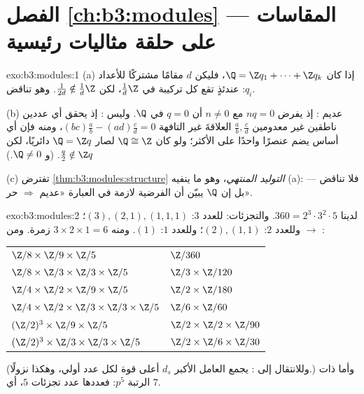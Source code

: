 \section*{الفصل \ref{ch:b3:modules} --- المقاسات على حلقة مثاليات
رئيسية}

\begin{solution}{exo:b3:modules:1}
(a) إذا كان $\Q = \Z q_1 + \dots + \Z q_k$، فليكن $d$ مقامًا مشتركًا للأعداد $q_i$: عندئذٍ
تقع كل تركيبة في $\frac1d\Z$، لكن $\frac1{2d} \notin \frac1d\Z$. وهو تناقض.

(b) عديم : إذ يفرض $nq = 0$ مع $n \neq 0$ أن $q = 0$ في
$\Q$. وليس : إذ يحقق أي عددين ناطقين غير معدومين $\frac ab, \frac cd$
العلاقةَ غير التافهة $(bc)\frac ab - (ad)\frac cd =
0$، ومنه فإن أي أساس يضم عنصرًا واحدًا
على الأكثر؛ ولو كان $\Q \cong \Z$ لصار $\Q = \Z q$ دائريًا، لكن
$\frac q2 \notin \Z q$. (و $\Q \neq
0$.)

(c) تفترض \cref{thm:b3:modules:structure} \emph{التوليد المنتهي}، وهو ما ينفيه (a):
فلا تناقض --- بل إن $\Q$ يبيّن أن الفرضية لازمة في العبارة
«عديم  $\Rightarrow$ حر».
\end{solution}

\begin{solution}{exo:b3:modules:2}
لدينا $360 = 2^3\cdot3^2\cdot5$. والتجزئات: للعدد $3$: $(3), (2,1),
(1,1,1)$؛ وللعدد $2$:
$(2), (1,1)$؛ وللعدد $1$: $(1)$. ومنه $3 \times 2
\times 1 = 6$ زمرة. ومن  $\to$ :
\begin{center}
\begin{tabular}{l l}
$\Z/8 \times \Z/9 \times \Z/5$ & $\Z/360$\\
$\Z/8 \times \Z/3 \times \Z/3 \times \Z/5$ & $\Z/3 \times
\Z/120$\\
$\Z/4 \times \Z/2 \times \Z/9 \times \Z/5$ & $\Z/2 \times
\Z/180$\\
$\Z/4 \times \Z/2 \times \Z/3 \times \Z/3 \times \Z/5$ & $\Z/6
\times \Z/60$\\
$(\Z/2)^3 \times \Z/9 \times \Z/5$ & $\Z/2 \times \Z/2 \times
\Z/90$\\
$(\Z/2)^3 \times \Z/3 \times \Z/3 \times \Z/5$ & $\Z/2 \times
\Z/6 \times \Z/30$
\end{tabular}
\end{center}
(وللانتقال إلى : يجمع العامل الأكبر $d_s$ أعلى
قوة لكل عدد أولي، وهكذا نزولًا.) وأما ذات الرتبة $p^5$: فعددها
عدد تجزئات $5$، أي $7$.
\end{solution}

